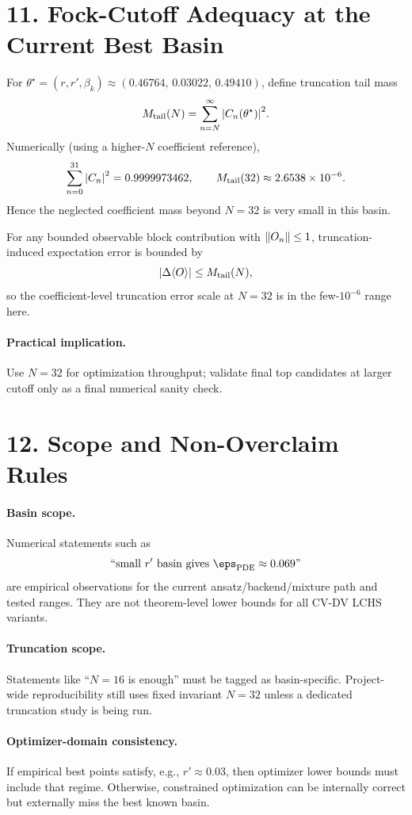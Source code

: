 \documentclass[11pt]{article}
\begin{document}
\section*{11. Fock-Cutoff Adequacy at the Current Best Basin}
For $\theta^\star=(r,r',\beta_k)\approx(0.46764,\,0.03022,\,0.49410)$, define truncation tail mass
\begin{equation}
M_{\mathrm{tail}}(N)=\sum_{n=N}^{\infty}\abs{C_n(\theta^\star)}^2.
\end{equation}
Numerically (using a higher-$N$ coefficient reference),
\begin{equation}
\sum_{n=0}^{31}\abs{C_n}^2 = 0.9999973462,\qquad
M_{\mathrm{tail}}(32)\approx 2.6538\times 10^{-6}.
\end{equation}
Hence the neglected coefficient mass beyond $N=32$ is very small in this basin.

For any bounded observable block contribution with $\norm{O_n}\le 1$, truncation-induced expectation error is bounded by
\begin{equation}
\abs{\Delta\!\expval{O}} \le M_{\mathrm{tail}}(N),
\end{equation}
so the coefficient-level truncation error scale at $N=32$ is in the few-$10^{-6}$ range here.

\paragraph{Practical implication.}
Use $N=32$ for optimization throughput; validate final top candidates at larger cutoff only as a final numerical sanity check.

\section*{12. Scope and Non-Overclaim Rules}
\paragraph{Basin scope.}
Numerical statements such as
\begin{equation}
\text{``small }r' \text{ basin gives } \eps_{\mathrm{PDE}}\approx 0.069\text{''}
\end{equation}
are empirical observations for the current ansatz/backend/mixture path and tested ranges.
They are not theorem-level lower bounds for all CV-DV LCHS variants.

\paragraph{Truncation scope.}
Statements like ``$N=16$ is enough'' must be tagged as basin-specific.
Project-wide reproducibility still uses fixed invariant $N=32$ unless a dedicated truncation study is being run.

\paragraph{Optimizer-domain consistency.}
If empirical best points satisfy, e.g., $r' \approx 0.03$, then optimizer lower bounds must include that regime.
Otherwise, constrained optimization can be internally correct but externally miss the best known basin.
\end{document}
